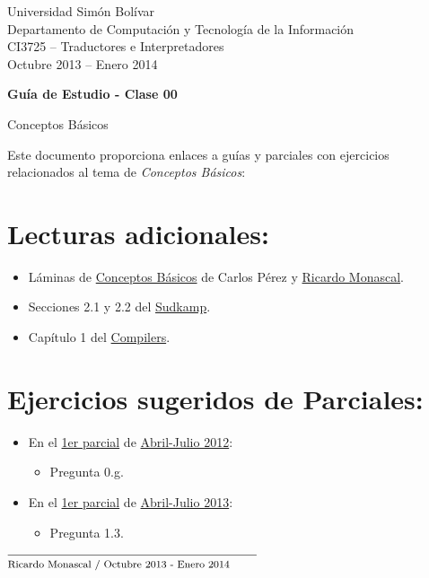 \documentclass[11pt]{article}
\begin{document}
    \noindent
    {\footnotesize
    Universidad Simón Bolívar \\
    Departamento de Computación y Tecnología de la Información \\
    CI3725 -- Traductores e Interpretadores \\
    Octubre 2013 -- Enero 2014
    }
    

    \bigskip
    \begin{center}
    {\Large {\bf
        Guía de Estudio - Clase 00
        
        Conceptos Básicos
    }}
    \end{center}
    
Este documento proporciona enlaces a guías y parciales con ejercicios relacionados al tema de \emph{Conceptos Básicos}:

    \section{Lecturas adicionales:}
    

\begin{itemize}
	\item Láminas de \href{http://ldc.usb.ve/~rmonascal/cursos/ci3725_aj12/archivos/clase0.pdf}{Conceptos Básicos} de Carlos Pérez y \href{http://ldc.usb.ve/~rmonascal/}{Ricardo Monascal}.
	\item Secciones 2.1 y 2.2 del \href{http://www.amazon.com/Languages-Machines-Introduction-Computer-Science/dp/0321322215}{Sudkamp}.
	\item Capítulo 1 del \href{http://www.amazon.com/Compilers-Principles-Techniques-Alfred-Aho/dp/0201100886}{Compilers}.
\end{itemize}


    \section{Ejercicios sugeridos de Parciales:}
    

\begin{itemize}
	\item En el \href{http://ldc.usb.ve/~rmonascal/cursos/ci3725\_aj12/archivos/e1\_sol.pdf}{1er parcial} de \href{http://ldc.usb.ve/~rmonascal/cursos/ci3725\_aj12/index.html}{Abril-Julio 2012}:
	\begin{itemize}
		\item Pregunta 0.g.
	\end{itemize}

	\item En el \href{http://ldc.usb.ve/~emhn/cursos/ci3725/201304/P1-Soluci\%C3\%B3n.pdf}{1er parcial} de \href{http://ldc.usb.ve/~emhn/cursos/ci3725/201304/}{Abril-Julio 2013}:
	\begin{itemize}
		\item Pregunta 1.3.
	\end{itemize}

\end{itemize}


    \vfill
    \noindent
    \mbox{$ \overline{
        \raisebox{-0.5ex}[1.5ex]{\footnotesize Ricardo Monascal / Octubre 2013 - Enero 2014}
        \hspace{5ex}
    } $}
    
\end{document}
